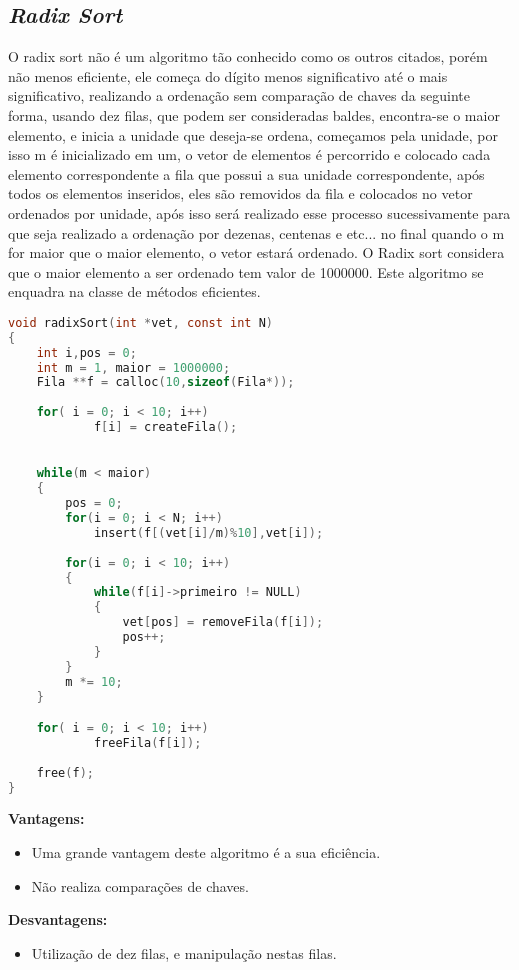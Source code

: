 \documentclass[
	12pt,				%
	oneside,			%
	a4paper,			%
	english,			%
	brazil,				%
	]{article}
\begin{document}
\subsection{\textit{Radix Sort}}
O radix sort não é um algoritmo tão conhecido como os outros citados, porém não menos eficiente, ele começa do dígito menos significativo até o mais significativo, 
realizando a ordenação sem comparação de chaves da seguinte forma, usando dez filas, que podem ser consideradas baldes, encontra-se o maior elemento, e inicia a unidade que 
deseja-se ordena, começamos pela unidade, por isso m é inicializado em um, o vetor de elementos é percorrido e colocado cada elemento correspondente a fila que possui a sua unidade
correspondente, após todos os elementos inseridos, eles são removidos da fila e colocados no vetor ordenados por unidade, após isso será realizado esse processo sucessivamente
 para que seja realizado a ordenação por dezenas, centenas e etc... no final quando o m for maior que o maior elemento, o vetor estará ordenado. O Radix sort considera que o maior elemento a ser ordenado tem valor de 1000000. Este algoritmo se enquadra na classe de métodos eficientes.\cite{Radix}

\begin{lstlisting}[language=C, caption=Estrutura \textit{Radix}]
void radixSort(int *vet, const int N)
{
	int i,pos = 0;
	int m = 1, maior = 1000000;
	Fila **f = calloc(10,sizeof(Fila*));
	
	for( i = 0; i < 10; i++)
			f[i] = createFila();

	
	while(m < maior)
	{
		pos = 0;
		for(i = 0; i < N; i++)
			insert(f[(vet[i]/m)%10],vet[i]); 
	
		for(i = 0; i < 10; i++)
		{
			while(f[i]->primeiro != NULL)
			{
				vet[pos] = removeFila(f[i]);
				pos++;
			}
		}
		m *= 10;
	}	

	for( i = 0; i < 10; i++)	
			freeFila(f[i]);
	
	free(f);	
}
\end{lstlisting}
\textbf{Vantagens:}
\begin{itemize}
 \item Uma grande vantagem deste algoritmo é a sua eficiência.
 \item Não realiza comparações de chaves.
\end{itemize}
\textbf{Desvantagens:}
\begin{itemize}
 \item Utilização de dez filas, e manipulação nestas filas.
\end{itemize}
\end{document}
